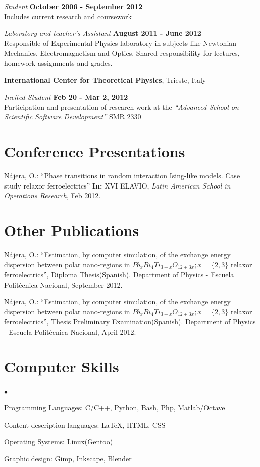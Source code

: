 \documentclass[margin,line]{res}
\newenvironment{list2}{
  \begin{list}{$\bullet$}{%
      \setlength{\itemsep}{0in}
      \setlength{\parsep}{0in} \setlength{\parskip}{0in}
      \setlength{\topsep}{0in} \setlength{\partopsep}{0in} 
      \setlength{\leftmargin}{0.2in}}}{\end{list}}
\begin{document}
\begin{resume}
    {\em Student} \hfill {\bf October 2006 - September 2012}\\
    Includes current research and coursework

    {\em Laboratory and teacher's Assistant} \hfill {\bf August 2011 - June 2012}\\
    Responsible of Experimental Physics laboratory in subjects
    like Newtonian Mechanics, Electromagnetism and Optics.
    Shared responsibility for lectures, homework assignments and grades.


  {\bf International Center for Theoretical Physics}, Trieste, Italy
    \vspace{-.3cm}

    {\em Invited Student} \hfill {\bf Feb 20 - Mar 2, 2012} \\
    Participation and presentation of research work at the {\em ``Advanced School on Scientific
    Software Development''} SMR 2330

\section{\sc Conference Presentations}
  Nájera, O.: ``Phase transitions in random interaction Ising-like models. Case study relaxor
  ferroelectrics'' {\bf In:} XVI ELAVIO, {\em Latin American School in Operations Research}, Feb 2012.

\section{\sc Other Publications}
  Nájera, O.: ``Estimation, by computer simulation, of the exchange energy dispersion between
  polar nano-regions in $Pb_xBi_4Ti_{3+x}O_{12+3x}; x=\{2,3\}$ relaxor ferroelectrics'', Diploma
  Thesis(Spanish). Department of Physics - Escuela Politécnica Nacional, September 2012.


  Nájera, O.: ``Estimation, by computer simulation, of the exchange energy dispersion between
  polar nano-regions in $Pb_xBi_4Ti_{3+x}O_{12+3x}; x=\{2,3\}$ relaxor ferroelectrics'', Thesis
  Preliminary Examination(Spanish). Department of Physics - Escuela Politécnica Nacional, April 2012.


\section{\sc Computer Skills}
  \begin{list2}
    \item Programming Languages:  C/C++, Python, Bash, Php, Matlab/Octave
    \item Content-description languages: \LaTeX, HTML, CSS
    \item Operating Systems:  Linux(Gentoo)
    \item Graphic design: Gimp, Inkscape, Blender
  \end{list2}


\end{resume}
\end{document}
